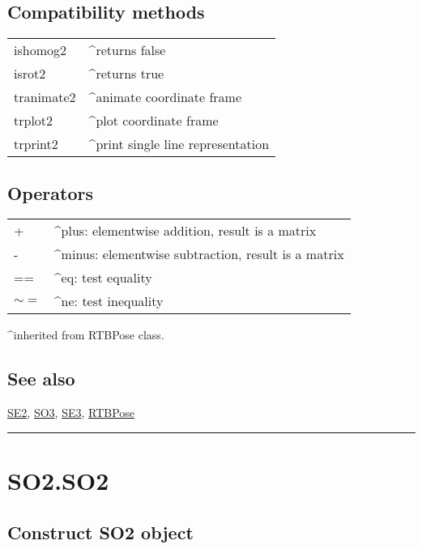 \subsection*{Compatibility methods}
\begin{longtable}{lp{120mm}}
ishomog2 & \textasciicircum returns false\\ 
isrot2 & \textasciicircum returns true\\ 
tranimate2 & \textasciicircum animate coordinate frame\\ 
trplot2 & \textasciicircum plot coordinate frame\\ 
trprint2 & \textasciicircum print single line representation\\ 
\end{longtable}\vspace{1ex}

\subsection*{Operators}
\begin{longtable}{lp{120mm}}
+ & \textasciicircum plus: elementwise addition, result is a matrix\\ 
- & \textasciicircum minus: elementwise subtraction, result is a matrix\\ 
== & \textasciicircum eq: test equality\\ 
$\sim=$ & \textasciicircum ne: test inequality\\ 
\end{longtable}\vspace{1ex}


\textasciicircum  inherited from RTBPose class.


\subsection*{See also}


\hyperlink{SE2}{\color{blue} SE2}, \hyperlink{SO3}{\color{blue} SO3}, \hyperlink{SE3}{\color{blue} SE3}, \hyperlink{RTBPose}{\color{blue} RTBPose}

\vspace{1.5ex}\hrule

\hypertarget{SO2.SO2}{\section*{SO2.SO2}}
\subsection*{Construct SO2 object}


